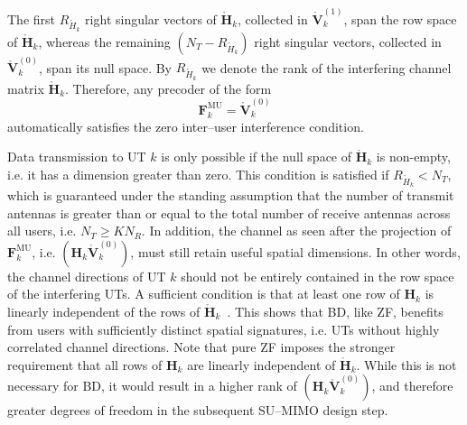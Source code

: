 The first $R_{\mathring{H}_k}$ right singular vectors of $\mathring{\mathbf{H}}_k$, collected in $\mathring{\mathbf{V}}_{k}^{(1)}$, span the row space of $\mathring{\mathbf{H}}_k$, whereas the remaining $(N_T - R_{\mathring{H}_k})$ right singular vectors, collected in $\mathring{\mathbf{V}}_{k}^{(0)}$, span its null space.
By $R_{\mathring{H}_k}$ we denote the rank of the interfering channel matrix $\mathring{\mathbf{H}}_k$.
Therefore, any precoder of the form
\begin{equation}
    \mathbf{F}_k^{\mathrm{MU}} = \mathring{\mathbf{V}}_{k}^{(0)}
\end{equation}
automatically satisfies the zero inter--user interference condition.

Data transmission to \ac{UT} $k$ is only possible if the null space of $\mathring{\mathbf{H}}_k$ is non-empty, i.e. it has a dimension greater than zero.
This condition is satisfied if $R_{\mathring{H}_k} < N_T$, which is guaranteed under the standing assumption that the number of transmit antennas is greater than or equal to the total number of receive antennas across all users, i.e. $N_T \geq K N_R$.
In addition, the channel as seen after the projection of $\mathbf{F}_k^{\mathrm{MU}}$, i.e. $(\mathbf{H}_k \mathring{\mathbf{V}}_{k}^{(0)})$, must still retain useful spatial dimensions.
In other words, the channel directions of \ac{UT} $k$ should not be entirely contained in the row space of the interfering \acp{UT}.
A sufficient condition is that at least one row of $\mathbf{H}_k$ is linearly independent of the rows of $\mathring{\mathbf{H}}_k$~\cite{matrix_analysis_horn_johnson_1985}.
This shows that \ac{BD}, like \ac{ZF}, benefits from users with sufficiently distinct spatial signatures, i.e. \acp{UT} without highly correlated channel directions.
Note that pure \ac{ZF} imposes the stronger requirement that all rows of $\mathbf{H}_k$ are linearly independent of $\mathring{\mathbf{H}}_k$.
While this is not necessary for \ac{BD}, it would result in a higher rank of $(\mathbf{H}_k \mathring{\mathbf{V}}_{k}^{(0)})$, and therefore greater degrees of freedom in the subsequent \ac{SU}--\ac{MIMO} design step.

